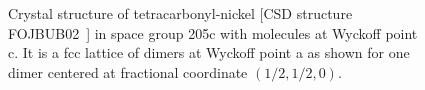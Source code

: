 \documentclass[preprint]{revtex4}              %
\begin{document}
\begin{figure}
\begin{center}
\caption[Crystal structure of tetracarbonyl-nickel in space group
205c]{Crystal structure of tetracarbonyl-nickel [CSD structure
FOJBUB02~\cite{Braga93}] in space group 205c with molecules at
Wyckoff point c. It is a fcc lattice of dimers at Wyckoff point a as
shown for one dimer centered at fractional coordinate
$(1/2,1/2,0)$.\label{dimers}}
\end{center}
\end{figure}
\end{document}

